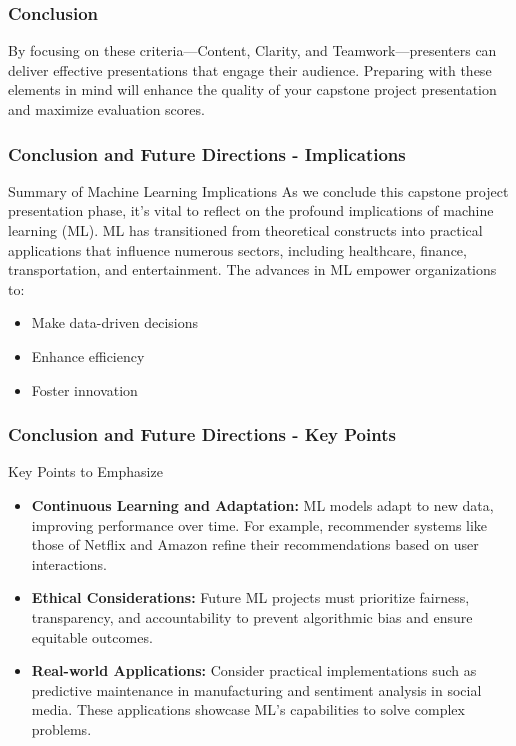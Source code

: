 \documentclass[aspectratio=169]{beamer}
\begin{document}
\begin{frame}[fragile]
  \frametitle{Conclusion}
  By focusing on these criteria—Content, Clarity, and Teamwork—presenters can deliver effective presentations that engage their audience. 
  Preparing with these elements in mind will enhance the quality of your capstone project presentation and maximize evaluation scores.
\end{frame}

\begin{frame}[fragile]
    \frametitle{Conclusion and Future Directions - Implications}
    \begin{block}{Summary of Machine Learning Implications}
        As we conclude this capstone project presentation phase, it's vital to reflect on the profound implications of machine learning (ML). ML has transitioned from theoretical constructs into practical applications that influence numerous sectors, including healthcare, finance, transportation, and entertainment. The advances in ML empower organizations to:
    \end{block}
    \begin{itemize}
        \item Make data-driven decisions
        \item Enhance efficiency
        \item Foster innovation
    \end{itemize}
\end{frame}

\begin{frame}[fragile]
    \frametitle{Conclusion and Future Directions - Key Points}
    \begin{block}{Key Points to Emphasize}
        \begin{itemize}
            \item \textbf{Continuous Learning and Adaptation:}
                ML models adapt to new data, improving performance over time. For example, recommender systems like those of Netflix and Amazon refine their recommendations based on user interactions.
            \item \textbf{Ethical Considerations:}
                Future ML projects must prioritize fairness, transparency, and accountability to prevent algorithmic bias and ensure equitable outcomes.
            \item \textbf{Real-world Applications:}
                Consider practical implementations such as predictive maintenance in manufacturing and sentiment analysis in social media. These applications showcase ML's capabilities to solve complex problems.
        \end{itemize}
    \end{block}
\end{frame}
\end{document}
